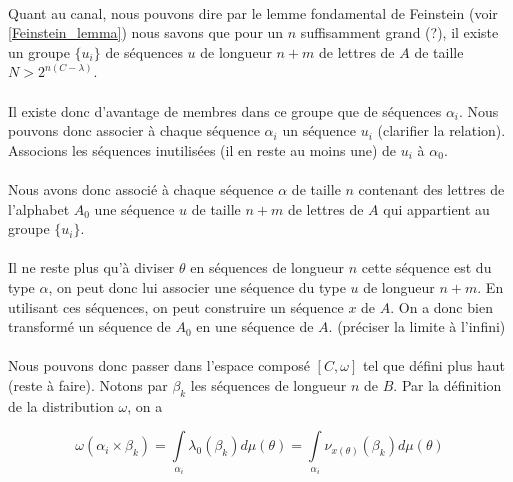 	\paragraph{}
	Quant au canal, nous pouvons dire par le lemme fondamental de Feinstein (voir \ref{Feinstein_lemma}) nous savons que pour un $n$ suffisamment grand (?), 
	il existe un groupe $\{u_i\}$ de séquences $u$ de longueur $n+m$ de lettres de $A$ de taille $N > 2^{n(C-\lambda)}$.
	
	\paragraph{}
	Il existe donc d'avantage de membres dans ce groupe que de séquences $\alpha_i$. Nous pouvons donc associer à chaque séquence $\alpha_i$
	un séquence $u_i$ (clarifier la relation). Associons les séquences inutilisées (il en reste au moins une) de $u_i$ à $\alpha_0$.
	
	\paragraph{}
	Nous avons donc associé à chaque séquence $\alpha$ de taille $n$ contenant des lettres de l'alphabet $A_0$ une séquence $u$ de taille $n+m$ de
	lettres de $A$ qui appartient au groupe $\{u_i\}$. 
	
	\paragraph{}
	Il ne reste plus qu'à diviser $\theta$ en séquences de longueur $n$ cette séquence est du type $\alpha$, on peut donc lui 
	associer une séquence du type $u$ de longueur $n+m$. En utilisant ces séquences, on peut construire un séquence $x$ de $A$. On a donc bien transformé
	un séquence de $A_0$ en une séquence de $A$. (préciser la limite à l'infini)
	
	\paragraph{}
	Nous pouvons donc passer dans l'espace composé $[C,\omega]$ tel que défini plus haut (reste à faire). Notons par $\beta_k$ les séquences de longueur $n$ de $B$.
	Par la définition de la distribution $\omega$, on a 
	
	\[\omega(\alpha_i\times\beta_k)=\int\limits_{\alpha_i}\lambda_0(\beta_k)d\mu(\theta)=\int\limits_{\alpha_i}\nu_{x(\theta)}(\beta_k)d\mu(\theta)\]
	
